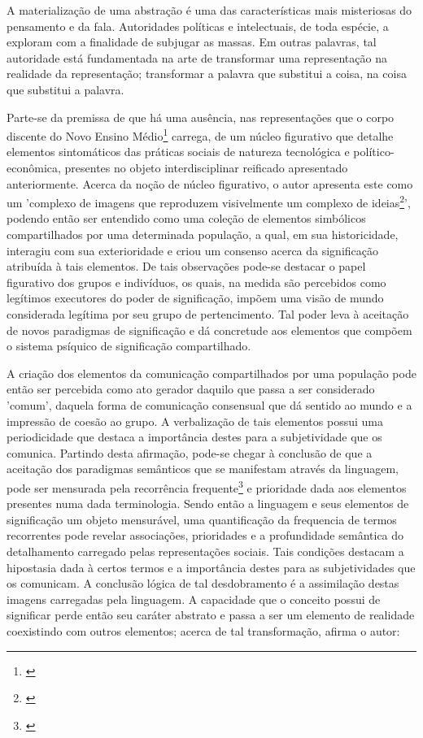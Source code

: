 \documentclass[
   article,       %
   12pt,          %
   oneside,       %
   a4paper,       %
   english,       %
   brazil,           %
   sumario=tradicional
   ]{abntex2}
\begin{document}
\begin{citacao}
A materialização de uma abstração é uma das características
mais misteriosas do pensamento e da fala. Autoridades políticas e
intelectuais, de toda espécie, a exploram com a finalidade de 
subjugar as massas.  Em outras palavras, tal autoridade está 
fundamentada na arte de transformar uma representação na realidade
da representação; transformar a palavra que substitui a coisa, na
coisa que substitui a palavra.\cite[p.78]{Representacees_sociais_moscovici}
\end{citacao}


Parte-se da premissa de que há uma ausência, nas representações que o corpo discente do Novo Ensino Médio\footnote{\cite{Itinirarios_nem}} carrega, de um núcleo figurativo que detalhe elementos sintomáticos das práticas sociais de natureza tecnológica e político-econômica, presentes no objeto interdisciplinar reificado apresentado anteriormente. Acerca da noção de núcleo figurativo, o autor apresenta este como um 'complexo de imagens que reproduzem visivelmente um complexo de ideias\footnote{\cite[p.72]{Representacees_sociais_moscovici}}', podendo então ser entendido como uma coleção de elementos simbólicos compartilhados por uma determinada população, a qual, em sua historicidade, interagiu com sua exterioridade e criou um consenso acerca da significação atribuída à tais elementos. De tais observações pode-se destacar o papel figurativo dos grupos e indivíduos, os quais, na medida são percebidos como legítimos executores do poder de significação, impõem uma visão de mundo considerada legítima por seu grupo de pertencimento. Tal poder leva à aceitação de novos paradigmas de significação e dá concretude aos elementos que compõem o sistema psíquico de significação compartilhado.

A criação dos elementos da comunicação compartilhados por uma população pode então ser percebida como ato gerador daquilo que passa a ser considerado 'comum', daquela forma de comunicação consensual  que dá sentido ao mundo e a impressão de coesão ao grupo. A verbalização de tais elementos possui uma periodicidade que destaca a importância destes para a subjetividade que os comunica. Partindo desta afirmação, pode-se chegar à conclusão de que a aceitação dos paradigmas semânticos que se manifestam através da linguagem, pode ser mensurada pela recorrência frequente\footnote{\cite[p.73]{Representacees_sociais_moscovici}} e prioridade dada aos elementos presentes numa dada terminologia. Sendo então a linguagem e seus elementos de significação um objeto mensurável, uma quantificação da frequencia de termos recorrentes pode revelar associações, prioridades e a profundidade semântica do detalhamento carregado pelas representações sociais. Tais condições destacam a hipostasia dada à certos termos e a importância destes para as subjetividades que os comunicam. A conclusão lógica de tal desdobramento é a assimilação destas imagens carregadas pela linguagem. A capacidade que o conceito possui de significar perde então seu caráter abstrato e passa a ser um elemento de realidade coexistindo com outros elementos; acerca de tal transformação, afirma o autor:
\end{document}
